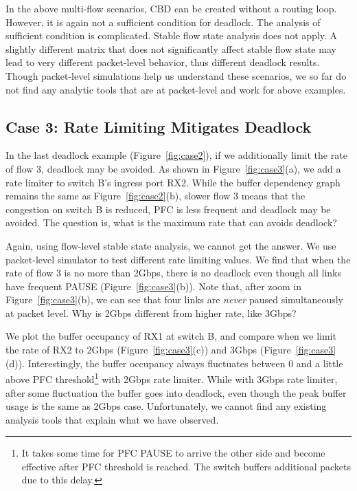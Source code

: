 
In the above multi-flow scenarios, CBD can be created without
a routing loop. However, it is again not a sufficient condition for deadlock. The analysis of sufficient
condition is complicated. Stable flow state analysis does not apply.
A slightly different matrix that does not significantly affect stable flow state may lead
to very different packet-level behavior, thus different deadlock results.
Though packet-level simulations help us understand these scenarios, we so far do not find
any analytic tools that are at packet-level and work for above examples.

\secspace
\subsection{Case 3: Rate Limiting Mitigates Deadlock}
\secspace

In the last deadlock example (Figure~\ref{fig:case2}), if we additionally limit the rate of flow 3, deadlock
may be avoided.  As shown in Figure~\ref{fig:case3}(a), we add a rate limiter to switch B's
ingress port RX2. While the buffer dependency graph remains the same as Figure~\ref{fig:case2}(b),
slower flow 3 means that the congestion on switch B is reduced, PFC is less
frequent and deadlock may be avoided. The question is, what is the maximum rate that can
avoids deadlock?

Again, using flow-level stable state analysis, we cannot get the answer. We use packet-level simulator
to test different rate limiting values. We find that when the rate of flow 3 is no more than 2Gbps,
there is no deadlock even though all links have frequent PAUSE (Figure~\ref{fig:case3}(b)).
Note that, after zoom in Figure~\ref{fig:case3}(b), we can see that four links are {\em never} paused
simultaneously at packet level. Why is 2Gbps different from higher rate, like 3Gbps?

We plot the buffer occupancy of RX1 at switch B, and compare when we limit the rate of RX2 to 2Gbps
(Figure~\ref{fig:case3}(c)) and 3Gbps (Figure~\ref{fig:case3}(d)). Interestingly, the buffer occupancy
always fluctuates between 0 and a little above PFC threshold\footnote{It takes some time for PFC PAUSE
to arrive the other side and become effective after PFC threshold is reached.
The switch buffers additional packets due to this delay.} with 2Gbps rate limiter. While with 3Gbps rate
limiter, after some fluctuation the buffer goes into deadlock, even though the peak buffer usage is the same
as 2Gbps case. Unfortunately, we cannot find any existing analysis tools that explain
what we have observed.

